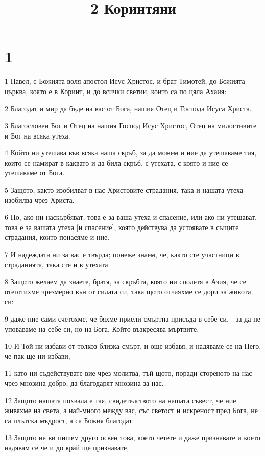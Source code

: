 

\title{2 Коринтяни}


\chapter{1}

\par 1 Павел, с Божията воля апостол Исус Христос, и брат Тимотей, до Божията църква, която е в Коринт, и до всички светии, които са по цяла Ахаия:
\par 2 Благодат и мир да бъде на вас от Бога, нашия Отец и Господа Исуса Христа.
\par 3 Благословен Бог и Отец на нашия Господ Исус Христос, Отец на милостивите и Бог на всяка утеха.
\par 4 Който ни утешава във всяка наша скръб, за да можем и ние да утешаваме тия, които се намират в каквато и да била скръб, с утехата, с която и ние се утешаваме от Бога.
\par 5 Защото, както изобилват в нас Христовите страдания, така и нашата утеха изобилва чрез Христа.
\par 6 Но, ако ни наскърбяват, това е за ваша утеха и спасение, или ако ни утешават, това е за вашата утеха [и спасение], която действува да устоявате в същите страдания, които понасяме и ние.
\par 7 И надеждата ни за вас е твърда; понеже знаем, че, както сте участници в страданията, така сте и в утехата.
\par 8 Защото желаем да знаете, братя, за скръбта, която ни сполетя в Азия, че се отеготихме чрезмерно вън от силата си, така щото отчаяхме се дори за живота си:
\par 9 даже ние сами счетохме, че бяхме приели смъртна присъда в себе си, - за да не уповаваме на себе си, но на Бога, Който възкресява мъртвите.
\par 10 И Той ни избави от толкоз близка смърт, и още избавя, и надяваме се на Него, че пак ще ни избави,
\par 11 като ни съдействувате вие чрез молитва, тъй щото, поради стореното на нас чрез мнозина добро, да благодарят мнозина за нас.
\par 12 Защото нашата похвала е тая, свидетелството на нашата съвест, че ние живяхме на света, а най-много между вас, със светост и искреност пред Бога, не са плътска мъдрост, а са Божия благодат.
\par 13 Защото не ви пишем друго освен това, което четете и даже признавате и което надявам се че и до край ще признавате,
